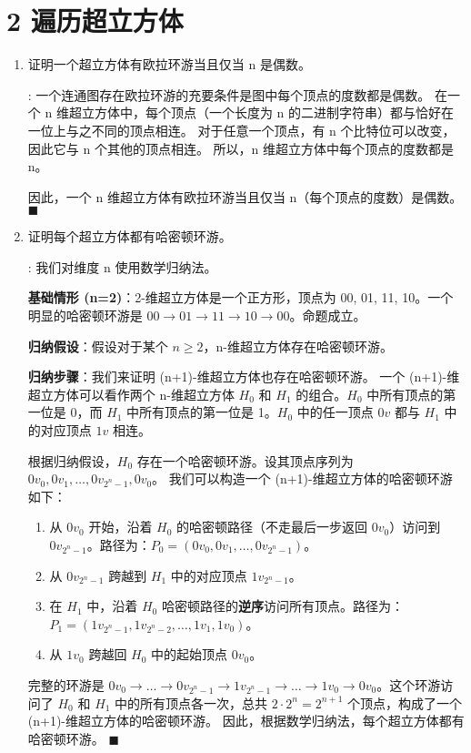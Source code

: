 \documentclass[11pt]{article}
\newenvironment{qparts}{\begin{enumerate}[{(}a{)}]}{\end{enumerate}}
\def\endproofmark{$\blacksquare$}
\newenvironment{proof}{\par\noindent{\bf 证明}:}{\endproofmark\smallskip}
\begin{document}
\section*{2 遍历超立方体}

\begin{qparts}
\item 证明一个超立方体有欧拉环游当且仅当 n 是偶数。
\begin{proof}
一个连通图存在欧拉环游的充要条件是图中每个顶点的度数都是偶数。
在一个 n 维超立方体中，每个顶点（一个长度为 n 的二进制字符串）都与恰好在一位上与之不同的顶点相连。
对于任意一个顶点，有 n 个比特位可以改变，因此它与 n 个其他的顶点相连。
所以，n 维超立方体中每个顶点的度数都是 n。

因此，一个 n 维超立方体有欧拉环游当且仅当 n（每个顶点的度数）是偶数。
\end{proof}

\item 证明每个超立方体都有哈密顿环游。
\begin{proof}
我们对维度 n 使用数学归纳法。

\textbf{基础情形 (n=2)}：2-维超立方体是一个正方形，顶点为 00, 01, 11, 10。一个明显的哈密顿环游是 $00 \to 01 \to 11 \to 10 \to 00$。命题成立。

\textbf{归纳假设}：假设对于某个 $n \ge 2$，n-维超立方体存在哈密顿环游。

\textbf{归纳步骤}：我们来证明 (n+1)-维超立方体也存在哈密顿环游。
一个 (n+1)-维超立方体可以看作两个 n-维超立方体 $H_0$ 和 $H_1$ 的组合。$H_0$ 中所有顶点的第一位是 0，而 $H_1$ 中所有顶点的第一位是 1。$H_0$ 中的任一顶点 $0v$ 都与 $H_1$ 中的对应顶点 $1v$ 相连。

根据归纳假设，$H_0$ 存在一个哈密顿环游。设其顶点序列为 $0v_0, 0v_1, \dots, 0v_{2^n-1}, 0v_0$。
我们可以构造一个 (n+1)-维超立方体的哈密顿环游如下：
\begin{enumerate}
    \item 从 $0v_0$ 开始，沿着 $H_0$ 的哈密顿路径（不走最后一步返回 $0v_0$）访问到 $0v_{2^n-1}$。路径为：$P_0 = (0v_0, 0v_1, \dots, 0v_{2^n-1})$。
    \item 从 $0v_{2^n-1}$ 跨越到 $H_1$ 中的对应顶点 $1v_{2^n-1}$。
    \item 在 $H_1$ 中，沿着 $H_0$ 哈密顿路径的\textbf{逆序}访问所有顶点。路径为：$P_1 = (1v_{2^n-1}, 1v_{2^n-2}, \dots, 1v_1, 1v_0)$。
    \item 从 $1v_0$ 跨越回 $H_0$ 中的起始顶点 $0v_0$。
\end{enumerate}
完整的环游是 $0v_0 \to \dots \to 0v_{2^n-1} \to 1v_{2^n-1} \to \dots \to 1v_0 \to 0v_0$。这个环游访问了 $H_0$ 和 $H_1$ 中的所有顶点各一次，总共 $2 \cdot 2^n = 2^{n+1}$ 个顶点，构成了一个 (n+1)-维超立方体的哈密顿环游。
因此，根据数学归纳法，每个超立方体都有哈密顿环游。
\end{proof}
\end{qparts}
\end{document}
